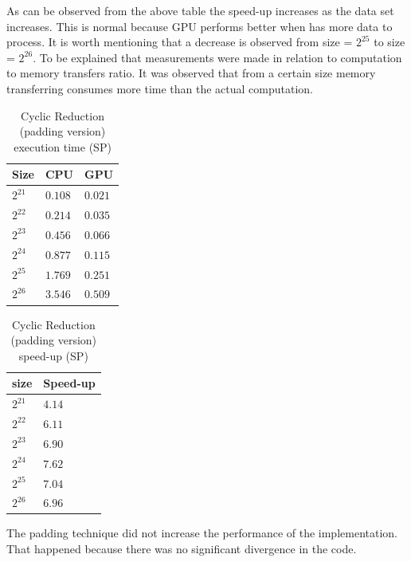 As can be observed from the above table the speed-up increases as the data set increases.
This is normal because GPU performs better when has more data to process. It is worth mentioning
that a decrease is observed from size = $2^{25}$ to size = $2^{26}$. To be explained that measurements were made in relation to computation to memory transfers ratio. It was observed that from a certain size memory transferring 
consumes more time than the actual computation.

\begin{table}[H]
\caption{Cyclic Reduction (padding version) execution time (SP)} 
\centering 
\begin{tabular}{| l | p{3cm} | p{3cm} |} 
\hline\hline 
Size & CPU & GPU  \\ [0.8ex] 
\hline 
$2^{21}$ & $0.108$ & $0.021$\\ 
$2^{22}$ & $0.214$ & $0.035$\\
$2^{23}$ & $0.456$ & $0.066$\\
$2^{24}$ & $0.877$ & $0.115$\\
$2^{25}$ & $1.769$ & $0.251$ \\ 
$2^{26}$ & $3.546$ & $0.509$ \\[1ex] 
\hline 
\end{tabular}
\label{table:cr_padding} 
\end{table}



\begin{table}[H]
\caption{Cyclic Reduction (padding version) speed-up (SP)} 
\centering 
\begin{tabular}{| l | p{3cm} |} 
\hline\hline 
size	 & Speed-up  \\  [0.8ex] 
\hline        
        $2^{21}$ & $4.14$      \\ 	
        $2^{22}$ & $6.11$     \\ 	
        $2^{23}$ & $6.90$      \\ 
        $2^{24}$ & $7.62$    \\ 
        $2^{25}$ & $7.04$     \\ 
        $2^{26}$ & $6.96$       \\ [1ex] 
        \hline
\end{tabular}
\label{table:cr_padding_spup} 
\end{table}

The padding technique did not increase the performance of the implementation. That happened because  there was no significant divergence in the code.


